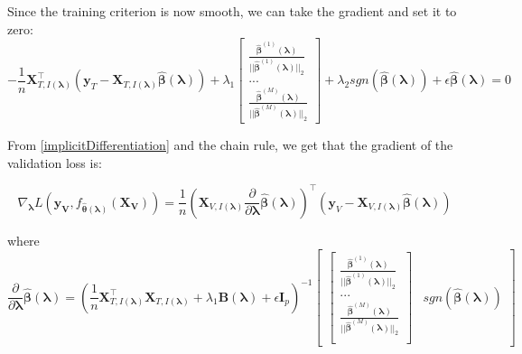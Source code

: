 \documentclass[12pt,letterpaper]{article}
\begin{document}
Since the training criterion is now smooth, we can take the gradient and set it to zero:
\begin{equation}
-\frac{1}{n} \boldsymbol{X}_{T, I(\boldsymbol\lambda)}^\top(\boldsymbol{y}_T - \boldsymbol{X}_{T, I(\boldsymbol\lambda)} \hat{\boldsymbol\beta}(\boldsymbol \lambda))
+ \lambda_1
\begin{bmatrix}
\frac{\hat{\boldsymbol{\beta}}^{(1)} (\boldsymbol \lambda)}{||\hat{\boldsymbol{\beta}}^{(1)} (\boldsymbol \lambda)||_2}\\
...\\
\frac{\hat{\boldsymbol\beta}^{(M)}(\boldsymbol \lambda)}{||\hat{\boldsymbol{\beta}}^{(M)} (\boldsymbol \lambda)||_2}
\end{bmatrix}
+ \lambda_2 sgn(\hat{\boldsymbol\beta}(\boldsymbol \lambda))
+ \epsilon \hat{\boldsymbol\beta}(\boldsymbol \lambda)
= 0
\end{equation}

From \eqref{implicitDifferentiation} and the chain rule, we get that the gradient of the validation loss is:

\begin{equation}
\nabla_{\boldsymbol \lambda} L(\boldsymbol{y_V}, f_{\hat{\boldsymbol{\theta}}(\boldsymbol{\lambda})}(\boldsymbol{X_V})) =
\frac{1}{n}
\left (
\boldsymbol{X}_{V, I(\boldsymbol\lambda)}
\frac{\partial}{\partial \boldsymbol\lambda} \hat{\boldsymbol{\beta}}(\boldsymbol{\lambda})
\right )^\top
\left (
\boldsymbol{y}_V - \boldsymbol{X}_{V, I(\boldsymbol\lambda)} \hat{\boldsymbol{\beta}}(\boldsymbol{\lambda})
\right )
\end{equation}

where 
\begin{equation}
\frac{\partial}{\partial \boldsymbol \lambda} \hat{\boldsymbol{\beta}}(\boldsymbol{\lambda})
=
\left (
\frac{1}{n} \boldsymbol{X}_{T, I(\boldsymbol\lambda)}^\top \boldsymbol{X}_{T, I(\boldsymbol\lambda)}
+ \lambda_1 \boldsymbol{B}(\boldsymbol\lambda)
+ \epsilon \boldsymbol I_p
\right ) ^{-1}
\begin{bmatrix}
\begin{bmatrix}
\frac{\hat{\boldsymbol{\beta}}^{(1)}(\boldsymbol \lambda)}{||\hat{\boldsymbol{\beta}}^{(1)} (\boldsymbol \lambda)||_2}\\
...\\
\frac{\hat{\boldsymbol \beta}^{(M)} (\boldsymbol \lambda)}{||\hat{\boldsymbol{\beta}}^{(M)}(\boldsymbol \lambda)||_2}\\
\end{bmatrix}
&
sgn(\hat{\boldsymbol{\beta}}(\boldsymbol{\lambda}))
\end{bmatrix}
\end{equation}
\end{document}
